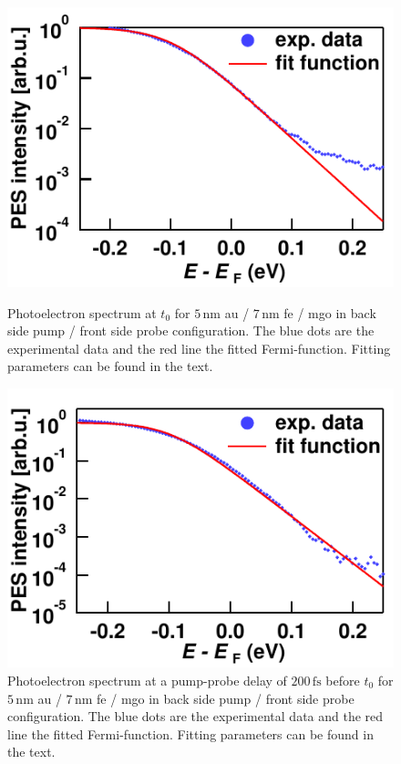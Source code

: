 \documentclass[a4paper,12pt,twoside]{article}
\begin{document}
	\begin{figure}[H]
		\begin{minipage}[t]{.45\linewidth}
			\includegraphics[width=\linewidth]{figures/fermifitt0update.pdf}
			\caption{Photoelectron spectrum at $t_0$ for $5\,\mathrm{nm}$ \gls{au} / $7\,\mathrm{nm}$ \gls{fe} / \gls{mgo} in back side pump / front side probe configuration. The blue dots are the experimental data and the red line the fitted Fermi-function. Fitting parameters can be found in the text.}
        		\label{fermifit}
		\end{minipage}
	\hspace{.075\linewidth}
		\begin{minipage}[t]{.45\linewidth}
			\includegraphics[width=\linewidth]{figures/fermifitbeforet0update.pdf}
			\caption{Photoelectron spectrum at a pump-probe delay of $200\,\mathrm{fs}$ before $t_0$ for $5\,\mathrm{nm}$ \gls{au} / $7\,\mathrm{nm}$ \gls{fe} / \gls{mgo} in back side pump / front side probe configuration. The blue dots are the experimental data and the red line the fitted Fermi-function. Fitting parameters can be found in the text.}
    			\label{fermifitt0}
		\end{minipage}
	\end{figure}
\end{document}
